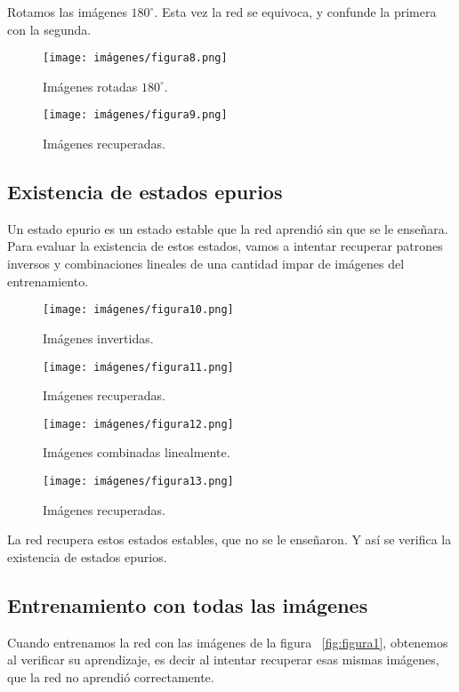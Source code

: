\documentclass[a4paper,12pt]{article}
\begin{document}
Rotamos las imágenes $180^{\circ}$. Esta vez la red se equivoca, y confunde la primera con la segunda.

\begin{figure}[!h]
    \centering
    \texttt{[image: imágenes/figura8.png]}
    \caption{Imágenes rotadas $180^{\circ}$.}
    \label{fig:figura8}
\end{figure}

\begin{figure}[!h]
    \centering
    \texttt{[image: imágenes/figura9.png]}
    \caption{Imágenes recuperadas.}
    \label{fig:figura9}
\end{figure}

\subsection{Existencia de estados epurios}
Un estado epurio es un estado estable que la red aprendió sin que se le enseñara. Para evaluar la existencia de estos estados, vamos a intentar recuperar patrones inversos y combinaciones lineales de una cantidad impar de imágenes del entrenamiento.

\begin{figure}[!h]
    \centering
    \texttt{[image: imágenes/figura10.png]}
    \caption{Imágenes invertidas.}
    \label{fig:figura10}
\end{figure}

\begin{figure}[!h]
    \centering
    \texttt{[image: imágenes/figura11.png]}
    \caption{Imágenes recuperadas.}
    \label{fig:figura11}
\end{figure}

\begin{figure}[!h]
    \centering
    \texttt{[image: imágenes/figura12.png]}
    \caption{Imágenes combinadas linealmente.}
    \label{fig:figura12}
\end{figure}

\begin{figure}[!h]
    \centering
    \texttt{[image: imágenes/figura13.png]}
    \caption{Imágenes recuperadas.}
    \label{fig:figura13}
\end{figure}

La red recupera estos estados estables, que no se le enseñaron. Y así se verifica la existencia de estados epurios.

\subsection{Entrenamiento con todas las imágenes}
Cuando entrenamos la red con las imágenes de la figura ~\ref{fig:figura1}, obtenemos al verificar su aprendizaje, es decir al intentar recuperar esas mismas imágenes, que la red no aprendió correctamente.
\end{document}
